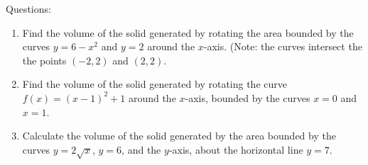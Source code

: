 \documentclass[16pt]{article}
\theoremstyle{remark}
\begin{document}
Questions:
\begin{enumerate}
\item Find the volume of the solid generated by rotating the area bounded by the curves $y=6-x^2$ and $y=2$ around the $x$-axis. (Note: the curves intersect the the points $(-2,2)$ and $(2,2)$.
\newpage
\item Find the volume of the solid generated by rotating the curve $f(x) = (x-1)^2+1$ around the $x$-axis, bounded by the curves $x=0$ and $x=1$.
\newpage
\item Calculate the volume of the solid generated by the area bounded by the curves $y=2\sqrt{x}$, $y=6$, and the $y$-axis, about the horizontal line $y=7$.
\end{enumerate}
\end{document}
